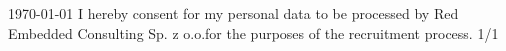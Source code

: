 \documentclass[11pt, a4paper]{awesome-cv}
\begin{document}
\makecvheader

\makecvfooter
  {\today}
  {I hereby consent for my personal data to be processed by Red Embedded Consulting Sp. z o.o.{\break}for the purposes of the recruitment process.}
  {1/1}



\end{document}

